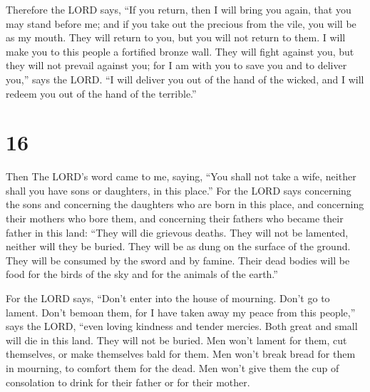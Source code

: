  Therefore the LORD says, ``If you return, then I will
bring you again, that you may stand before me; and if you take out the
precious from the vile, you will be as my mouth. They will return to
you, but you will not return to them.  I will make you to
this people a fortified bronze wall. They will fight against you, but
they will not prevail against you; for I am with you to save you and to
deliver you,'' says the LORD.  ``I will deliver you out
of the hand of the wicked, and I will redeem you out of the hand of the
terrible.''

\hypertarget{section-15}{%
\section{16}\label{section-15}}

 Then The LORD's word came to me, saying, 
``You shall not take a wife, neither shall you have sons or daughters,
in this place.''  For the LORD says concerning the sons
and concerning the daughters who are born in this place, and concerning
their mothers who bore them, and concerning their fathers who became
their father in this land:  ``They will die grievous
deaths. They will not be lamented, neither will they be buried. They
will be as dung on the surface of the ground. They will be consumed by
the sword and by famine. Their dead bodies will be food for the birds of
the sky and for the animals of the earth.''

 For the LORD says, ``Don't enter into the house of
mourning. Don't go to lament. Don't bemoan them, for I have taken away
my peace from this people,'' says the LORD, ``even loving kindness and
tender mercies.  Both great and small will die in this
land. They will not be buried. Men won't lament for them, cut
themselves, or make themselves bald for them.  Men won't
break bread for them in mourning, to comfort them for the dead. Men
won't give them the cup of consolation to drink for their father or for
their mother.

